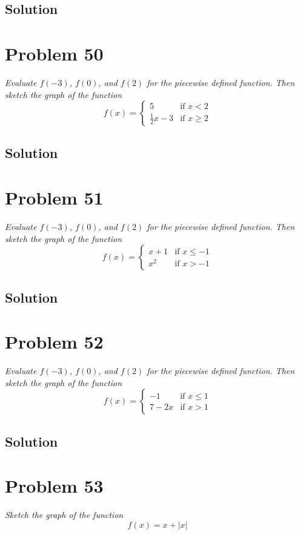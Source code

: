\documentclass[11pt]{article}
\newcommand{\soln}{\subsection*}
\newcommand{\qn}{\textit}
\begin{document}
\soln{Solution}

\section*{Problem 50}

\qn{Evaluate $f(-3)$, $f(0)$, and $f(2)$ for the piecewise defined function. Then sketch the graph of the function}
\begin{equation}
	f(x)=
	\begin{cases}
		5 & \text{if } x < 2\\
		\frac{1}{2}x-3 & \text{if } x \ge 2
	\end{cases}
\end{equation}

\soln{Solution}

\section*{Problem 51}

\qn{Evaluate $f(-3)$, $f(0)$, and $f(2)$ for the piecewise defined function. Then sketch the graph of the function}
\begin{equation}
	f(x)=
	\begin{cases}
		x+1 & \text{if } x \le -1\\
		x^2 & \text{if } x > -1
	\end{cases}
\end{equation}

\soln{Solution}

\section*{Problem 52}

\qn{Evaluate $f(-3)$, $f(0)$, and $f(2)$ for the piecewise defined function. Then sketch the graph of the function}
\begin{equation}
	f(x)=
	\begin{cases}
		-1 & \text{if } x \le 1\\
		7-2x & \text{if } x > 1
	\end{cases}
\end{equation}

\soln{Solution}

\section*{Problem 53}

\qn{Sketch the graph of the function $$f(x)=x+|x|$$}
\end{document}
